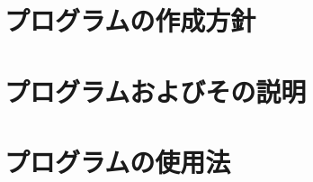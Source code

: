 \documentclass[a4j,11pt]{jarticle}
\begin{document}
\section{プログラムの作成方針}\label{sec:policy}






\section{プログラムおよびその説明}\label{sec:explanation}



\section{プログラムの使用法}\label{sec:howto}
\end{document}
